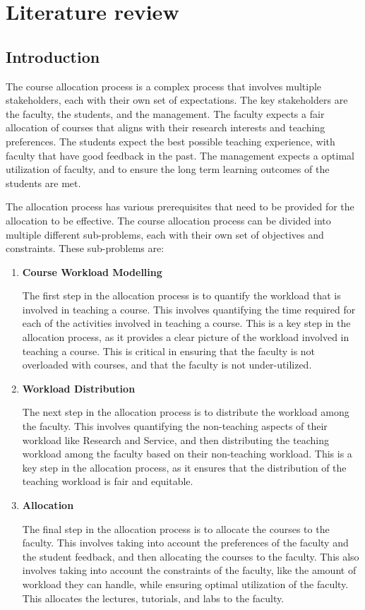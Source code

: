 \chapter{Literature review}

\section{Introduction}

The course allocation process is a complex process that involves multiple stakeholders, each with their own set of expectations. The key stakeholders are the faculty, the students, and the management. The faculty expects a fair allocation of courses that aligns with their research interests and teaching preferences. The students expect the best possible teaching experience, with faculty that have good feedback in the past. The management expects a optimal utilization of faculty, and to ensure the long term learning outcomes of the students are met.

The allocation process has various prerequisites that need to be provided for the allocation to be effective. The course allocation process can be divided into multiple different sub-problems, each with their own set of objectives and constraints. These sub-problems are:

\begin{enumerate}
  \item \textbf{Course Workload Modelling}

        The first step in the allocation process is to quantify the workload that is involved in teaching a course. This involves quantifying the time required for each of the activities involved in teaching a course. This is a key step in the allocation process, as it provides a clear picture of the workload involved in teaching a course. This is critical in ensuring that the faculty is not overloaded with courses, and that the faculty is not under-utilized.

  \item \textbf{Workload Distribution}

        The next step in the allocation process is to distribute the workload among the faculty. This involves quantifying the non-teaching aspects of their workload like Research and Service, and then distributing the teaching workload among the faculty based on their non-teaching workload. This is a key step in the allocation process, as it ensures that the distribution of the teaching workload is fair and equitable.

  \item \textbf{Allocation}

        The final step in the allocation process is to allocate the courses to the faculty. This involves taking into account the preferences of the faculty and the student feedback, and then allocating the courses to the faculty. This also involves taking into account the constraints of the faculty, like the amount of workload they can handle, while ensuring optimal utilization of the faculty. This allocates the lectures, tutorials, and labs to the faculty.

\end{enumerate}

